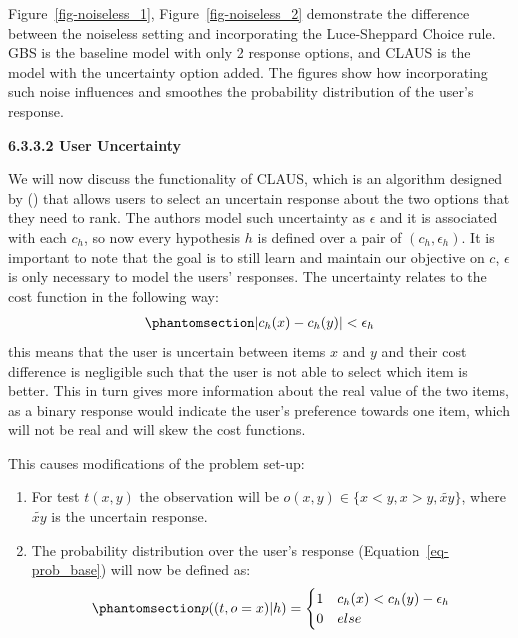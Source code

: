 \documentclass[
  letterpaper,
  numbers=noenddot,
  DIV=11]{scrreprt}
\theoremstyle{definition}
\theoremstyle{plain}
\theoremstyle{plain}
\theoremstyle{remark}
\begin{document}
Figure~\ref{fig-noiseless_1}, Figure~\ref{fig-noiseless_2} demonstrate
the difference between the noiseless setting and incorporating the
Luce-Sheppard Choice rule. GBS is the baseline model with only 2
response options, and CLAUS is the model with the uncertainty option
added. The figures show how incorporating such noise influences and
smoothes the probability distribution of the user's response.

\textbf{6.3.3.2 User Uncertainty}

We will now discuss the functionality of CLAUS, which is an algorithm
designed by () that allows
users to select an uncertain response about the two options that they
need to rank. The authors model such uncertainty as \(\epsilon\) and it
is associated with each \(c_h\), so now every hypothesis \(h\) is
defined over a pair of \((c_h, \epsilon_h)\). It is important to note
that the goal is to still learn and maintain our objective on \(c\),
\(\epsilon\) is only necessary to model the users' responses. The
uncertainty relates to the cost function in the following way:
\begin{equation}\phantomsection\label{eq-eq3.30}{\begin{aligned}
    |c_h(x) - c_h(y)| < \epsilon_h
\end{aligned}}\end{equation} this means that the user is uncertain
between items \(x\) and \(y\) and their cost difference is negligible
such that the user is not able to select which item is better. This in
turn gives more information about the real value of the two items, as a
binary response would indicate the user's preference towards one item,
which will not be real and will skew the cost functions.

This causes modifications of the problem set-up:

\begin{enumerate}
\def\labelenumi{\arabic{enumi}.}
\item
  For test \(t(x,y)\) the observation will be
  \(o(x,y) \in \{x<y, x>y, \tilde{xy}\}\), where \(\tilde{xy}\) is the
  uncertain response.
\item
  The probability distribution over the user's response
  (Equation~\ref{eq-prob_base}) will now be defined as:
  \begin{equation}\phantomsection\label{eq-eq3.31}{\begin{aligned}
  p((t, o = x) | h) = 
  \begin{cases}
      1 & c_h(x) < c_h(y) - \epsilon_h\\
      0 & else
  \end{cases}
  \end{aligned}}\end{equation}
\end{enumerate}
\end{document}
